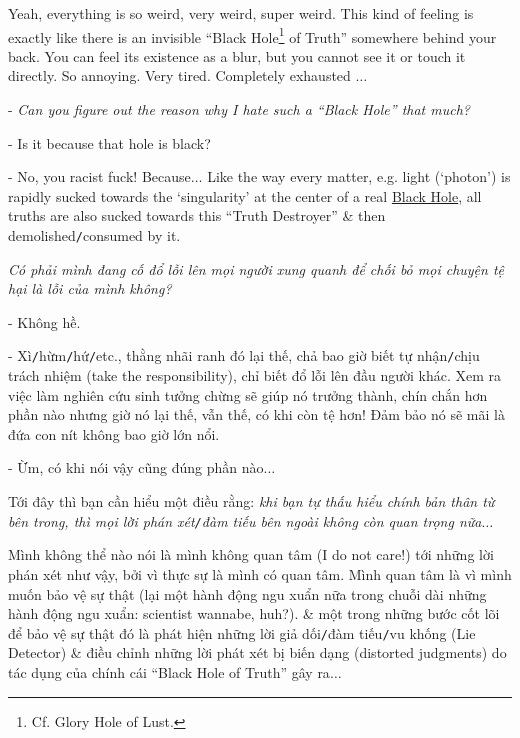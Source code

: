 \documentclass[12pt,twoside]{book}
\begin{document}
Yeah, everything is so weird, very weird, super weird. This kind of feeling is exactly like there is an invisible ``Black Hole\footnote{Cf. Glory Hole of {\sc Lust}.} of Truth'' somewhere behind your back. You can feel its existence as a blur, but you cannot see it or touch it directly. So annoying. Very tired. Completely exhausted $\ldots$

- {\it Can you figure out the reason why I hate such a ``Black Hole'' that much?}

- Is it because that hole is black?

- No, you racist fuck! Because$\ldots$ Like the way every matter, e.g. light (`photon') is rapidly sucked towards the `singularity' at the center of a real \href{https://en.wikipedia.org/wiki/Black_hole}{Black Hole}, all truths are also sucked towards this ``Truth Destroyer'' \& then demolished{\tt/}consumed by it.

{\it Có phải mình đang cố đổ lỗi lên mọi người xung quanh để chối bỏ mọi chuyện tệ hại là lỗi của mình không?}

- Không hề.

- Xì{\tt/}hừm{\tt/}hứ{\tt/}etc., thằng nhãi ranh đó lại thế, chả bao giờ biết tự nhận{\tt/}chịu trách nhiệm (take the responsibility), chỉ biết đổ lỗi lên đầu người khác. Xem ra việc làm nghiên cứu sinh tưởng chừng sẽ giúp nó trưởng thành, chín chắn hơn phần nào nhưng giờ nó lại thế, vẫn thế, có khi còn tệ hơn! Đảm bảo nó sẽ mãi là đứa con nít không bao giờ lớn nổi.

- Ừm, có khi nói vậy cũng đúng phần nào$\ldots$

Tới đây thì bạn cần hiểu một điều rằng: {\it khi bạn tự thấu hiểu chính bản thân từ bên trong, thì mọi lời phán xét{\tt/}đàm tiếu bên ngoài không còn quan trọng nữa}$\ldots$

Mình không thể nào nói là mình không quan tâm (I do not care!) tới những lời phán xét như vậy, bởi vì thực sự là mình có quan tâm. Mình quan tâm là vì mình muốn bảo vệ sự thật (lại một hành động ngu xuẩn nữa trong chuỗi dài những hành động ngu xuẩn: scientist wannabe, huh?). \& một trong những bước cốt lõi để bảo vệ sự thật đó là phát hiện những lời giả dối{\tt/}đàm tiếu{\tt/}vu khống (Lie Detector) \& điều chỉnh những lời phát xét bị biến dạng (distorted judgments) do tác dụng của chính cái ``Black Hole of Truth'' gây ra$\ldots$
\end{document}
